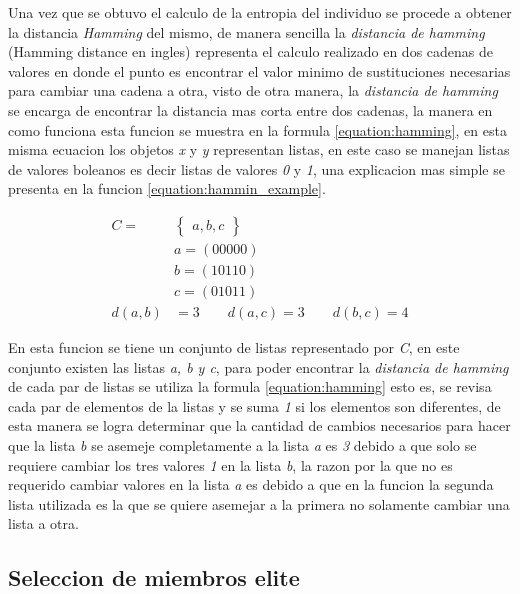 Una vez que se obtuvo el calculo de la entropia del individuo se procede a
obtener la distancia \textit{Hamming} del mismo, de manera sencilla la
\textit{distancia de hamming} (Hamming distance en ingles) representa el calculo
realizado en dos cadenas de valores en donde el punto es encontrar el valor
minimo de sustituciones necesarias para cambiar una cadena a otra, visto de otra
manera, la \textit{distancia de hamming} se encarga de encontrar la distancia
mas corta entre dos cadenas, la manera en como funciona esta funcion se muestra
en la formula \ref{equation:hamming}, en esta misma ecuacion los objetos
\textit{x} y \textit{y} representan listas, en este caso se manejan listas de
valores boleanos es decir listas de valores \textit{0} y \textit{1}, una
explicacion mas simple se presenta en la funcion \ref{equation:hammin_example}.

\begin{equation}
  \begin{split}
    C = & \begin{Bmatrix} a, b, c \end{Bmatrix} \\
     & a = (00000) \\
     & b = (10110) \\
     & c = (01011) \\
     d(a, b) & = 3 \qquad d(a, c) = 3 \qquad d(b, c) = 4
  \end{split}
  \label{equation:hammin_example}
\end{equation}

En esta funcion se tiene un conjunto de listas representado por \textit{C}, en
este conjunto existen las listas \textit{a, b y c}, para poder encontrar la
\textit{distancia de hamming} de cada par de listas se utiliza la formula
\ref{equation:hamming} esto es, se revisa cada par de elementos de la listas y
se suma \textit{1} si los elementos son diferentes, de esta manera se logra
determinar que la cantidad de cambios necesarios para hacer que la lista
\textit{b} se asemeje completamente a la lista \textit{a} es \textit{3} debido a
que solo se requiere cambiar los tres valores \textit{1} en la lista \textit{b},
la razon por la que no es requerido cambiar valores en la lista \textit{a} es
debido a que en la funcion la segunda lista utilizada es la que se quiere
asemejar a la primera no solamente cambiar una lista a otra.

\subsection{Seleccion de miembros elite}
\label{subsection:elite_selection}


